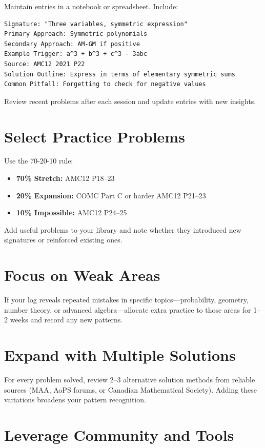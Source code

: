 \documentclass[11pt]{article}
\begin{document}
Maintain entries in a notebook or spreadsheet. Include:

\begin{verbatim}
Signature: "Three variables, symmetric expression"
Primary Approach: Symmetric polynomials
Secondary Approach: AM-GM if positive
Example Trigger: a^3 + b^3 + c^3 - 3abc
Source: AMC12 2021 P22
Solution Outline: Express in terms of elementary symmetric sums
Common Pitfall: Forgetting to check for negative values
\end{verbatim}

Review recent problems after each session and update entries with new insights.

\section{Select Practice Problems}

Use the 70-20-10 rule:

\begin{itemize}[leftmargin=*]
    \item \textbf{70\% Stretch:} AMC12 P18--23
    \item \textbf{20\% Expansion:} COMC Part C or harder AMC12 P21--23
    \item \textbf{10\% Impossible:} AMC12 P24--25
\end{itemize}

Add useful problems to your library and note whether they introduced new signatures or reinforced existing ones.

\section{Focus on Weak Areas}

If your log reveals repeated mistakes in specific topics---probability, geometry, number theory, or advanced algebra---allocate extra practice to those areas for 1--2 weeks and record any new patterns.

\section{Expand with Multiple Solutions}

For every problem solved, review 2--3 alternative solution methods from reliable sources (MAA, AoPS forums, or Canadian Mathematical Society). Adding these variations broadens your pattern recognition.

\section{Leverage Community and Tools}
\end{document}

